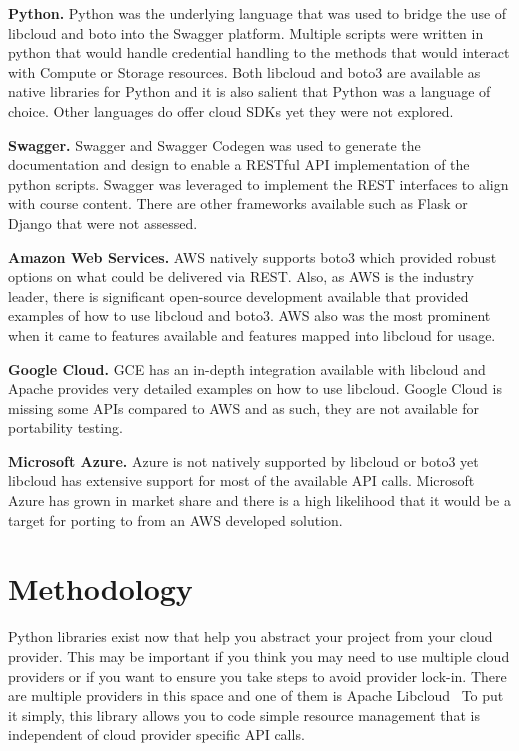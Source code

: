 \begin{description}

\item{\bf Python.} Python was the underlying language that was used to bridge
the use of libcloud and boto into the Swagger platform. Multiple scripts were
written in python that would handle credential handling to the methods that
would interact with Compute or Storage resources. Both libcloud and boto3 are
available as native libraries for Python and it is also salient that Python was
a language of choice. Other languages do offer cloud SDKs yet they were not
explored.
\item{\bf Swagger.} Swagger and Swagger Codegen was used to generate the
documentation and design to enable a RESTful API implementation of the python
scripts. Swagger was leveraged to implement the REST interfaces to
align with course content. There are other frameworks available such as Flask or
Django that were not assessed.
\item{\bf Amazon Web Services.} AWS natively supports boto3 which provided
robust options on what could be delivered via REST. Also, as AWS is the industry
leader, there is significant open-source development available that provided
examples of how to use libcloud and boto3. AWS also was the most prominent when
it came to features available and features mapped into libcloud for usage.
\item{\bf Google Cloud.} GCE has an in-depth integration available with
libcloud and Apache provides very detailed examples on how to use libcloud.
Google Cloud is missing some APIs compared to AWS and as such, they are not
available for portability testing.
\item{\bf Microsoft Azure.} Azure is not natively supported by libcloud or boto3
yet libcloud has extensive support for most of the available API calls.
Microsoft Azure has grown in market share and there is a high likelihood that it
would be a target for porting to from an AWS developed solution.

\end{description}

\section{Methodology}

Python libraries exist now that help you abstract your project from  your cloud
provider. This may be important if you think you may need to use multiple cloud
providers or if you want to ensure you take steps to avoid provider lock-in.
There are multiple providers in this space and one of them is Apache
Libcloud~\cite{hid-sp18-518-LibCloud} To put it simply, this library allows you
to code simple resource  management that is independent of cloud provider
specific API calls.

